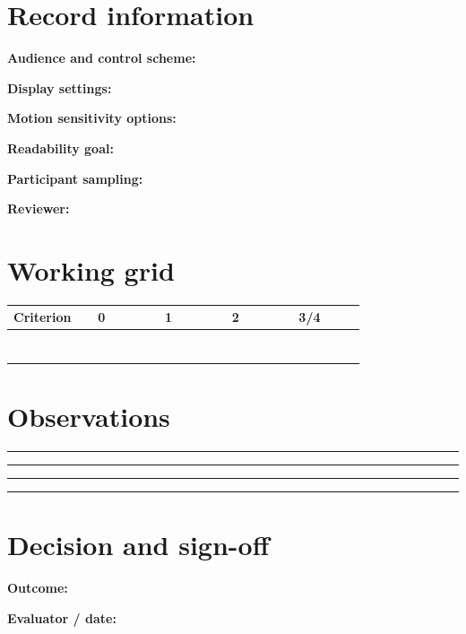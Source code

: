\documentclass[10pt,letterpaper]{article}
\begin{document}
\makedoctitle
\makedocsummary

\section{Record information}
\noindent\textbf{Audience and control scheme:}\quad\hrulefill\par\vspace{10pt}
\noindent\textbf{Display settings:}\quad\hrulefill\par\vspace{10pt}
\noindent\textbf{Motion sensitivity options:}\quad\hrulefill\par\vspace{10pt}
\noindent\textbf{Readability goal:}\quad\hrulefill\par\vspace{10pt}
\noindent\textbf{Participant sampling:}\quad\hrulefill\par\vspace{10pt}
\noindent\textbf{Reviewer:}\quad\hrulefill\par\vspace{10pt}\section{Working grid}
\begin{longtable}{|p{0.156\linewidth}|p{0.156\linewidth}|p{0.156\linewidth}|p{0.156\linewidth}|p{0.156\linewidth}|}
\hline
\textbf{Criterion} & \textbf{0} & \textbf{1} & \textbf{2} & \textbf{3/4}\\\hline
\endhead
\rule{0pt}{20pt} &  &  &  & \\\hline
\rule{0pt}{20pt} &  &  &  & \\\hline
\rule{0pt}{20pt} &  &  &  & \\\hline
\rule{0pt}{20pt} &  &  &  & \\\hline
\rule{0pt}{20pt} &  &  &  & \\\hline
\rule{0pt}{20pt} &  &  &  & \\\hline
\rule{0pt}{20pt} &  &  &  & \\\hline
\end{longtable}
\section{Observations}
\noindent\rule{\linewidth}{0.4pt}\par\vspace{18pt}\noindent\rule{\linewidth}{0.4pt}\par\vspace{18pt}\noindent\rule{\linewidth}{0.4pt}\par\vspace{18pt}\noindent\rule{\linewidth}{0.4pt}\par\vspace{18pt}\section{Decision and sign-off}
\noindent\textbf{Outcome:}\quad\hrulefill\par\vspace{16pt}\noindent\textbf{Evaluator / date:}\quad\hrulefill\par
\end{document}
